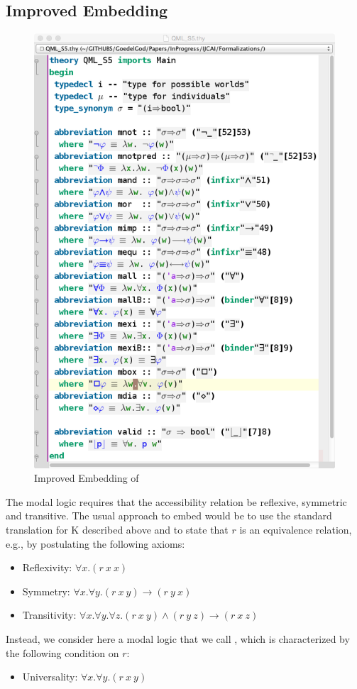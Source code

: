 \documentclass{article}
\begin{document}
\subsection{Improved Embedding}\label{sec:improvedembedding}
\begin{figure}[t]
\centerline{\includegraphics[width=\columnwidth]{./Images/QML_S5.png}}
\caption{Improved Embedding of \SFiveU} \label{QML_S5}
\end{figure}

The modal logic \SFive requires that the accessibility relation be
reflexive, symmetric and transitive. The usual approach to embed
\SFive would be to use the standard translation for K described above
and to state that $r$ is an equivalence relation, e.g., by postulating
the following axioms:
\begin{itemize}
\item Reflexivity: $\forall x. (r~x~x)$
\item Symmetry: $\forall x. \forall y. (r~x~y) \rightarrow (r~y~x)$ 
\item Transitivity: $\forall x. \forall y. \forall z. (r~x~y) \wedge (r~y~z) \rightarrow (r~x~z)$
\end{itemize}
Instead, we consider here a modal logic that we call \SFiveU, which is
characterized by the following condition on $r$:
\begin{itemize}
\item Universality: $\forall x. \forall y. (r~x~y)$
\end{itemize}
\end{document}
